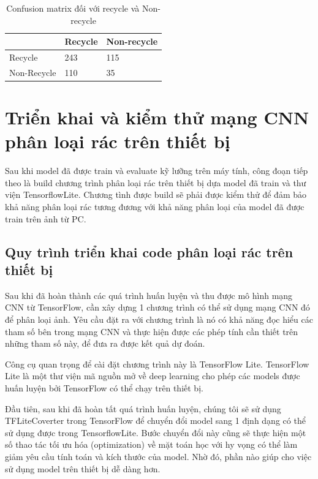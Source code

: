 \begin{table}[H]
    \caption{Confusion matrix đối với recycle và Non-recycle} 
    \label{tab.newCM}
    \centering
    \begin{tabular}{|l|l|l|}
        \hline
                & Recycle & Non-recycle\\ \hline
        Recycle & 243 & 115 \\ \hline
        Non-Recycle & 110 & 35 \\ \hline
    \end{tabular}
\end{table}



\section{Triển khai và kiểm thử mạng CNN phân loại rác trên thiết bị}
Sau khi model đã được train và evaluate kỹ lưỡng trên máy tính, công đoạn tiếp theo là build chương trình phân loại rác trên thiết bị dựa model đã train và thư viện TensorflowLite. 
Chương tình được build sẽ phải được kiểm thử để đảm bảo khả năng phân loại rác tương đương với khả năng phân loại của model đã được train trên ảnh từ PC.

\subsection{Quy trình triển khai code phân loại rác trên thiết bị}
Sau khi đã hoàn thành các quá trình huấn luyện và thu được mô hình mạng CNN từ TensorFlow, cần xây dựng 1 chương trình có thể sử dụng mạng CNN đó để phân loại ảnh. Yêu cầu đặt ra với chương trình là nó có khả năng đọc hiểu các tham số bên trong mạng CNN và thực hiện được các phép tính cần thiết trên những tham số này, để đưa ra được kết quả dự đoán.

Công cụ quan trọng để cài đặt chương trình này là TensorFlow Lite. TensorFlow Lite là một thư viện mã nguồn mở về deep learning cho phép các models được huấn luyện bởi TensorFlow có thể chạy trên thiết bị. 

Đầu tiên, sau khi đã hoàn tất quá trình huấn luyện, chúng tôi sẽ sử dụng TFLiteCoverter trong TensorFlow để chuyển đổi model sang 1 định dạng có thể sử dụng được trong TensorflowLite. Bước chuyển đổi này cũng sẽ thực hiện một số thao tác tối ưu hóa (optimization) về mặt toán học với hy vọng có thể làm giảm yêu cầu tính toán và kích thước của model. Nhờ đó, phần nào giúp cho việc sử dụng model trên thiết bị dễ dàng hơn.  

